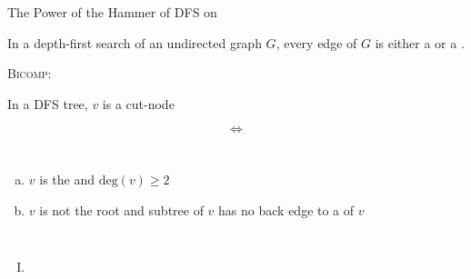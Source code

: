 \begin{frame}{}
  \begin{center}
    {\large The Power of the Hammer of DFS on }
  \end{center}


  \pause
  \begin{theorem}[Theorem $22.10$]
    In a depth-first search of an undirected graph $G$, 
    every edge of $G$ is either a  or a .
  \end{theorem}
\end{frame}

\begin{frame}{}

  \pause
  \begin{center}
  \end{center}
\end{frame}

\begin{frame}{}
  \centerline{\Large \textsc{Bicomp}: }

  \begin{center}
    
  \end{center}
\end{frame}

\begin{frame}{}
\end{frame}

\begin{frame}{}
  \begin{theorem}
    \centerline{In a DFS tree, $v$ is a cut-node}

    \[
      \iff
    \]

    \begin{columns}
	\begin{enumerate}[(a)]
	  \item $v$ is the  and $\text{deg}(v) \ge 2$
	  \item $v$ is not the root and  subtree of $v$ has no back edge to a  of $v$
	\end{enumerate}
    \end{columns}
  \end{theorem}

  \pause
  \vspace{0.80cm}
  \begin{enumerate}[(I)]
    \centering
    \item {}
  \end{enumerate}
\end{frame}

